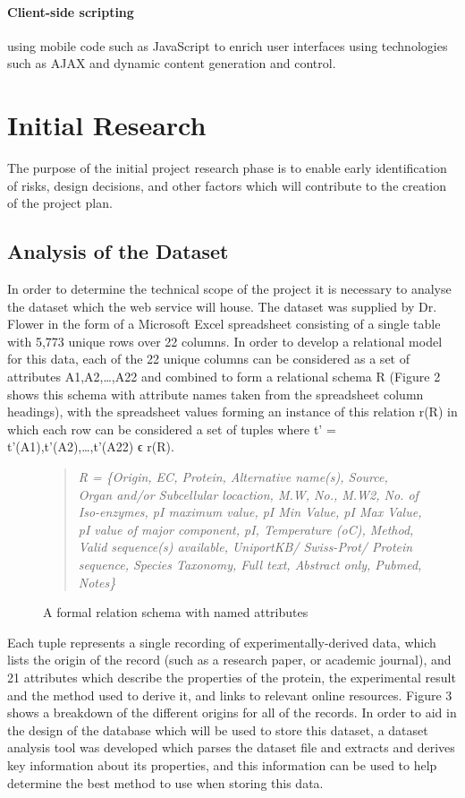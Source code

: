 \documentclass[12pt,a4paper]{article}
\begin{document}
\paragraph{Client-side scripting} using mobile code such as JavaScript to enrich
user interfaces using technologies such as AJAX and dynamic content generation
and control.

\section{Initial Research}

The purpose of the initial project research phase is to enable early
identification of risks, design decisions, and other factors which will
contribute to the creation of the project plan.

\subsection{Analysis of the Dataset}

In order to determine the technical scope of the project it is necessary to
analyse the dataset which the web service will house. The dataset was supplied
by Dr. Flower in the form of a Microsoft Excel spreadsheet consisting of a
single table with 5,773 unique rows over 22 columns. In order to develop a
relational model for this data, each of the 22 unique columns can be considered
as a set of attributes A1,A2,…,A22 and combined to form a relational schema R
(Figure 2 shows this schema with attribute names taken from the spreadsheet
column headings), with the spreadsheet values forming an instance of this
relation r(R) in which each row can be considered a set of tuples where t' =
{t'(A1),t'(A2),…,t'(A22)} ϵ r(R).

\begin{figure}[H]
\centering
\begin{quote}
\textit{R = \{Origin, EC, Protein, Alternative name(s), Source, Organ and/or
  Subcellular locaction, M.W, No., M.W2, No. of Iso-enzymes, pI maximum value,
  pI Min Value, pI Max Value, pI value of major component, pI, Temperature (oC),
  Method, Valid sequence(s) available, UniportKB/ Swiss-Prot/ Protein sequence,
  Species Taxonomy, Full text, Abstract only, Pubmed, Notes\}}
\end{quote}
\caption{A formal relation schema with named attributes}
\label{fig:formal-schema-names-attributes}
\end{figure}

Each tuple represents a single recording of experimentally-derived data, which
lists the origin of the record (such as a research paper, or academic journal),
and 21 attributes which describe the properties of the protein, the experimental
result and the method used to derive it, and links to relevant online
resources. Figure 3 shows a breakdown of the different origins for all of the
records. In order to aid in the design of the database which will be used to
store this dataset, a dataset analysis tool was developed which parses the
dataset file and extracts and derives key information about its properties, and
this information can be used to help determine the best method to use when
storing this data.
\end{document}
